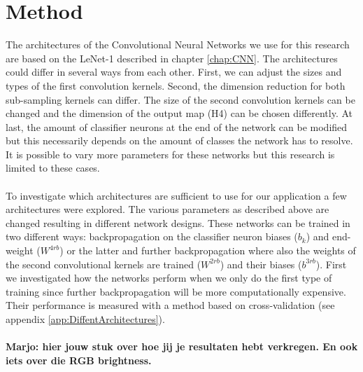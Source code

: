 \documentclass[a4paper,onecolumn]{report}
\begin{document}
\begin{small}
\begin{equation}
\end{equation}
\end{small}


\chapter{Method}
\label{chap:method}
The architectures of the Convolutional Neural Networks we use for this research are based on the LeNet-1 described in chapter \ref{chap:CNN}. The architectures could differ in several ways from each other. First, we can adjust the sizes and types of the first convolution kernels. Second, the dimension reduction for both sub-sampling kernels can differ. The size of the second convolution kernels can be changed and the dimension of the output map (H4) can be chosen differently. At last, the amount of classifier neurons at the end of the network can be modified but this necessarily depends on the amount of classes the network has to resolve.  It is possible to vary more parameters for these networks but this research is limited to these cases. 
\\\\
To investigate which architectures are sufficient to use for our application a few architectures were explored. The various parameters as described above are changed resulting in different network designs. These networks can be trained in two different ways: backpropagation on the classifier neuron biases ($b_{k}$) and end-weight ($ W^{4rb}$) or the latter and further backpropagation where also the weights of the second convolutional kernels are trained ($ W^{2rb} $) and their biases ($b^{3rb}$). First we investigated how the networks perform when we only do the first type of training since further backpropagation will be more computationally expensive. Their performance is measured with a method based on cross-validation (see appendix \ref{app:DiffentArchitectures}). 
\\\\
\textbf{Marjo: hier jouw stuk over hoe jij je resultaten hebt verkregen. En ook iets over die RGB brightness. }
\\\\
\end{document}
